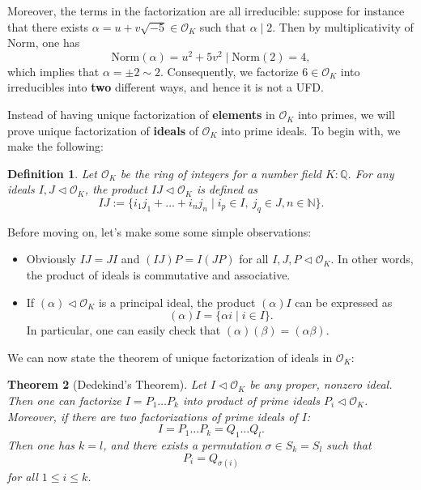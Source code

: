 \documentclass[11pt]{book}
\newtheorem{theorem}{Theorem}[section]
\newtheorem{definition}[theorem]{Definition}
\begin{document}
Moreover, the terms in the factorization are all irreducible: suppose for instance that there exists \( \alpha = u + v\sqrt{-5} \in \mathcal{O}_K \) such that \( \alpha \mid 2 \). Then by multiplicativity of $\mathrm{Norm}$, one has
$$\mathrm{Norm}(\alpha) = u^2 + 5v^2 \mid \mathrm{Norm}(2) = 4,$$
which implies that $\alpha = \pm 2 \sim 2$.
Consequently, we factorize $6 \in \mathcal{O}_K$ into irreducibles into {\bf two} different ways, and hence it is not a UFD.

\bigskip
Instead of having unique factorization of {\bf elements} in $\mathcal{O}_K$ into primes, we will prove unique factorization of {\bf ideals} of $\mathcal{O}_K$ into prime ideals. To begin with, we make the following:
\begin{definition}
    Let $\mathcal{O}_K$ be the ring of integers for a number field $K:\mathbb{Q}$. For any ideals $I, J \lhd \mathcal{O}_K$, the product $IJ \lhd \mathcal{O}_K$ is defined as
        $$IJ := \{i_1j_1 + \dots + i_nj_n \mid i_p \in I,\ j_q \in J, n \in \mathbb{N}\}.$$
\end{definition}
Before moving on, let's make some some simple observations:
\begin{itemize}
    \item Obviously $IJ = JI$ and $(IJ)P = I(JP)$ for all $I, J, P \lhd \mathcal{O}_K$. In other words, the product of ideals is commutative and associative.
    \item If $(\alpha) \lhd \mathcal{O}_K$ is a principal ideal, the product $(\alpha)I$ can be expressed as
    $$(\alpha)I = \{\alpha i \mid i \in I\}.$$
    In particular, one can easily check that $(\alpha)(\beta) = (\alpha \beta)$.
\end{itemize}
We can now state the theorem of unique factorization of ideals in $\mathcal{O}_K$:
\begin{theorem}[Dedekind's Theorem] \label{thm-dedekind}
    Let $I \lhd \mathcal{O}_K$ be any proper, nonzero ideal. Then one can factorize $I = P_1 \dots P_k$ into product of prime ideals $P_i \lhd \mathcal{O}_K$. Moreover, if there are two factorizations of prime ideals of $I$:
    $$I = P_1 \dots P_k = Q_1 \dots Q_l.$$
    Then one has $k = l$, and there exists a permutation $\sigma \in S_k = S_l$ such that
    $$P_i = Q_{\sigma(i)}$$
    for all $1 \leq i \leq k$.
    
\end{theorem}
\end{document}
